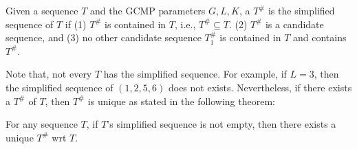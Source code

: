 
\begin{definition}
Given a sequence $T$ and the GCMP parameters $G,L,K$, a $T^\#$ is
the simplified sequence of $T$ if (1) $T^\#$ is contained in $T$, i.e., $T^\# \subseteq T$.
(2) $T^\#$ is a candidate sequence, and (3) no other candidate sequence
$T^\#_1$ is contained in $T$ and contains $T^\#$.
\end{definition}
Note that, not every $T$ has the simplified sequence.  For example, if $L =3$,
then the simplified sequence of $(1,2,5,6)$ does not exists.
Nevertheless, if there exists a $T^\#$ of $T$, then $T^\#$ is unique
as stated in the following theorem:
\begin{theorem}
For any sequence $T$, if $T$'s simplified sequence is not empty, then
there exists a unique $T^\#$ wrt $T$.
\end{theorem}

